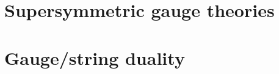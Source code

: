 \documentclass{UUThesisTemplate}
\begin{document}

\mainmatter
    
    
    
   
   \part{Supersymmetric gauge theories }
     
     
     
   \part{Gauge/string duality}
     
     
%      
     
     
     
     
     
      
	
\backmatter
    
\end{document}
